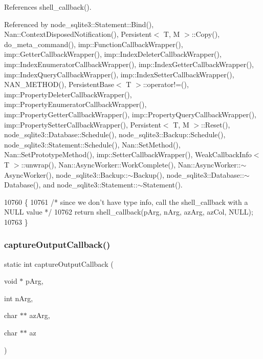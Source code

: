 References shell\+\_\+callback().



Referenced by node\+\_\+sqlite3\+::\+Statement\+::\+Bind(), Nan\+::\+Context\+Disposed\+Notification(), Persistent$<$ T, M $>$\+::\+Copy(), do\+\_\+meta\+\_\+command(), imp\+::\+Function\+Callback\+Wrapper(), imp\+::\+Getter\+Callback\+Wrapper(), imp\+::\+Index\+Deleter\+Callback\+Wrapper(), imp\+::\+Index\+Enumerator\+Callback\+Wrapper(), imp\+::\+Index\+Getter\+Callback\+Wrapper(), imp\+::\+Index\+Query\+Callback\+Wrapper(), imp\+::\+Index\+Setter\+Callback\+Wrapper(), N\+A\+N\+\_\+\+M\+E\+T\+H\+O\+D(), Persistent\+Base$<$ T $>$\+::operator!=(), imp\+::\+Property\+Deleter\+Callback\+Wrapper(), imp\+::\+Property\+Enumerator\+Callback\+Wrapper(), imp\+::\+Property\+Getter\+Callback\+Wrapper(), imp\+::\+Property\+Query\+Callback\+Wrapper(), imp\+::\+Property\+Setter\+Callback\+Wrapper(), Persistent$<$ T, M $>$\+::\+Reset(), node\+\_\+sqlite3\+::\+Database\+::\+Schedule(), node\+\_\+sqlite3\+::\+Backup\+::\+Schedule(), node\+\_\+sqlite3\+::\+Statement\+::\+Schedule(), Nan\+::\+Set\+Method(), Nan\+::\+Set\+Prototype\+Method(), imp\+::\+Setter\+Callback\+Wrapper(), Weak\+Callback\+Info$<$ T $>$\+::unwrap(), Nan\+::\+Async\+Worker\+::\+Work\+Complete(), Nan\+::\+Async\+Worker\+::$\sim$\+Async\+Worker(), node\+\_\+sqlite3\+::\+Backup\+::$\sim$\+Backup(), node\+\_\+sqlite3\+::\+Database\+::$\sim$\+Database(), and node\+\_\+sqlite3\+::\+Statement\+::$\sim$\+Statement().


\begin{DoxyCode}
10760                                                                      \{
10761   \textcolor{comment}{/* since we don't have type info, call the shell\_callback with a NULL value */}
10762   \textcolor{keywordflow}{return} shell_callback(pArg, nArg, azArg, azCol, NULL);
10763 \}
\end{DoxyCode}
\mbox{\label{shell_8c_a9dfdefbfac1c168c17f6ebb68f53d159}} 
\subsubsection{capture\+Output\+Callback()}
{\footnotesize\ttfamily static int capture\+Output\+Callback (\begin{DoxyParamCaption}\item[{void $\ast$}]{p\+Arg,  }\item[{int}]{n\+Arg,  }\item[{char $\ast$$\ast$}]{az\+Arg,  }\item[{char $\ast$$\ast$}]{az }\end{DoxyParamCaption})\hspace{0.3cm}{\ttfamily [static]}}



